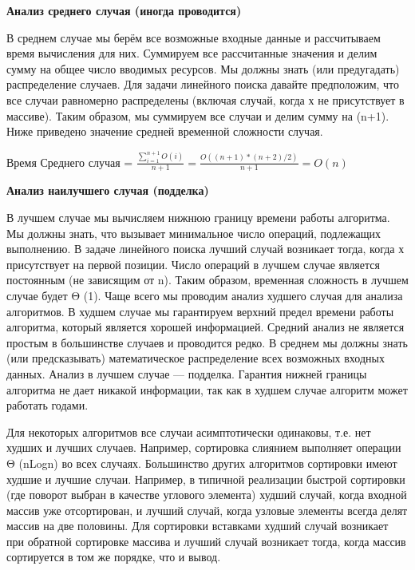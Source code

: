 \vspace{\baselineskip}
\textbf{Анализ среднего случая (иногда проводится)}

\vspace{\baselineskip}
В среднем случае мы берём все возможные входные данные и рассчитываем время вычисления для них. Суммируем все рассчитанные значения и делим сумму на общее число вводимых ресурсов. Мы должны знать (или предугадать) распределение случаев. Для задачи линейного поиска давайте предположим, что все случаи равномерно распределены (включая случай, когда х не присутствует в массиве). Таким образом, мы суммируем все случаи и делим сумму на (n+1). Ниже приведено значение средней временной сложности случая.

\vspace{\baselineskip}
\begin{tcolorbox}

Время Среднего случая = $\frac{\sum^{n+1}_{i=1} O(i)}{n+1}=\frac{O((n+1)*(n+2)/2)}{n+1}=O(n)$

\end{tcolorbox}

\vspace{\baselineskip}
\textbf{Анализ наилучшего случая (подделка)}

\vspace{\baselineskip}
В лучшем случае мы вычисляем нижнюю границу времени работы алгоритма. Мы должны знать, что вызывает минимальное число операций, подлежащих выполнению. В задаче линейного поиска лучший случай возникает тогда, когда х присутствует на первой позиции. Число операций в лучшем случае является постоянным (не зависящим от n). Таким образом, временная сложность в лучшем случае будет Θ (1). Чаще всего мы проводим анализ худшего случая для анализа алгоритмов. В худшем случае мы гарантируем верхний предел времени работы алгоритма, который является хорошей информацией. Средний анализ не является простым в большинстве случаев и проводится редко. В среднем мы должны знать (или предсказывать) математическое распределение всех возможных входных данных. Анализ в лучшем случае --- подделка. Гарантия нижней границы алгоритма не дает никакой информации, так как в худшем случае алгоритм может работать годами.

\vspace{\baselineskip}
Для некоторых алгоритмов все случаи асимптотически одинаковы, т.е. нет худших и лучших случаев. Например, сортировка слиянием выполняет операции Θ (nLogn) во всех случаях. Большинство других алгоритмов сортировки имеют худшие и лучшие случаи. Например, в типичной реализации быстрой сортировки (где поворот выбран в качестве углового элемента) худший случай, когда входной массив уже отсортирован, и лучший случай, когда узловые элементы всегда делят массив на две половины. Для сортировки вставками худший случай возникает при обратной сортировке массива и лучший случай возникает тогда,
когда массив сортируется в том же порядке, что и вывод.

